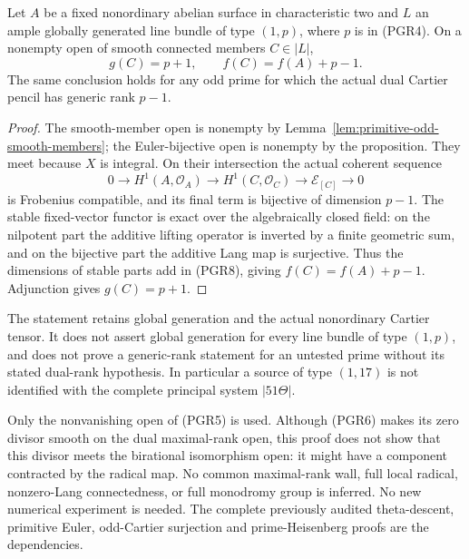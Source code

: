 \begin{theorem}
\label{thm:primitive-prime-generic-curve-rank}
Let \(A\) be a fixed nonordinary abelian surface in characteristic
two and \(L\) an ample globally generated line bundle of type
\((1,p)\), where \(p\) is in (PGR4). On a nonempty open of
smooth connected members \(C\in|L|\),
\[
                   g(C)=p+1,\qquad
                   f(C)=f(A)+p-1.                  \tag{PGR7}
\]
The same conclusion holds for any odd prime for which the actual
dual Cartier pencil has generic rank \(p-1\).
\end{theorem}
\begin{proof}
The smooth-member open is nonempty by
Lemma~\ref{lem:primitive-odd-smooth-members}; the Euler-bijective
open is nonempty by the proposition. They meet because \(X\)
is integral. On their intersection the actual coherent sequence
\[
 0\longrightarrow H^1(A,\mathcal O_A)
 \longrightarrow H^1(C,\mathcal O_C)
 \longrightarrow\mathcal E_{[C]}\longrightarrow0
                                                        \tag{PGR8}
\]
is Frobenius compatible, and its final term is bijective of
dimension \(p-1\). The stable fixed-vector functor is exact
over the algebraically closed field: on the nilpotent part the
additive lifting operator is inverted by a finite geometric sum,
and on the bijective part the additive Lang map is surjective.
Thus the dimensions of stable parts add in (PGR8), giving
\(f(C)=f(A)+p-1\). Adjunction gives \(g(C)=p+1\).
\end{proof}

\begin{remark}
\label{rem:primitive-prime-generic-rank-scope}
The statement retains global generation and the actual nonordinary
Cartier tensor. It does not assert global generation for every
line bundle of type \((1,p)\), and does not prove a generic-rank
statement for an untested prime without its stated dual-rank
hypothesis. In particular a source of type \((1,17)\) is not
identified with the complete principal system \(|51\Theta|\).

Only the nonvanishing open of (PGR5) is used. Although (PGR6)
makes its zero divisor smooth on the dual maximal-rank open,
this proof does not show that this divisor meets the birational
isomorphism open: it might have a component contracted by the
radical map. No common maximal-rank wall, full local radical,
nonzero-Lang connectedness, or full monodromy group is inferred.
No new numerical experiment is needed. The complete previously
audited theta-descent, primitive Euler, odd-Cartier surjection and
prime-Heisenberg proofs are the dependencies.
\end{remark}
